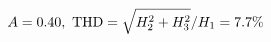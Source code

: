 \documentclass[preview]{standalone}
\begin{document}
\begin{align*}
\special{dvisvgm:raw <g id='unique000'>}A=0.40,\ \text{THD}=\sqrt{H_2^2+H_3^2}/H_1=7.7\%\special{dvisvgm:raw </g>}
\end{align*}
\end{document}
